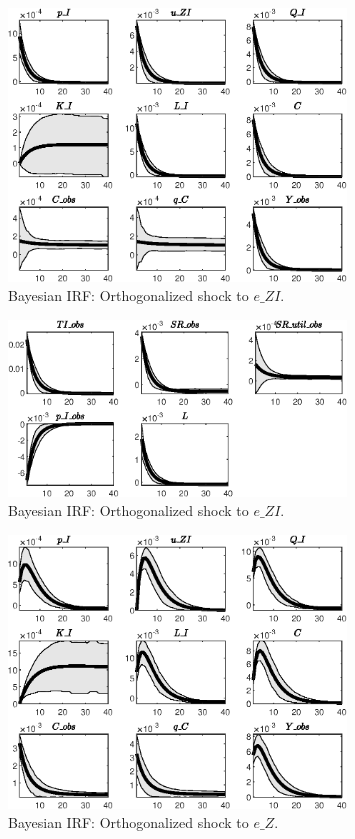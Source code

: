  
\begin{figure}[H]
\centering 
\includegraphics[width=0.80\textwidth]{directed_search/Output/directed_search_Bayesian_IRF_e_ZI_1}
\caption{Bayesian IRF: Orthogonalized shock to $e\_ZI$.}
\label{Fig:BayesianIRF:e_ZI:1}
\end{figure}
 
\begin{figure}[H]
\centering 
\includegraphics[width=0.80\textwidth]{directed_search/Output/directed_search_Bayesian_IRF_e_ZI_2}
\caption{Bayesian IRF: Orthogonalized shock to $e\_ZI$.}
\label{Fig:BayesianIRF:e_ZI:2}
\end{figure}
 
\begin{figure}[H]
\centering 
\includegraphics[width=0.80\textwidth]{directed_search/Output/directed_search_Bayesian_IRF_e_Z_1}
\caption{Bayesian IRF: Orthogonalized shock to $e\_Z$.}
\label{Fig:BayesianIRF:e_Z:1}
\end{figure}
 
